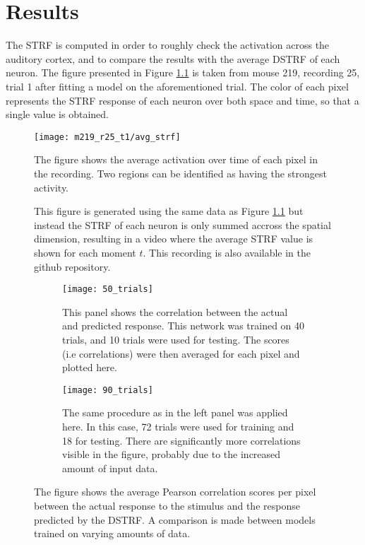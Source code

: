\chapter{Results}\label{results}

The STRF is computed in order to roughly check the activation across the auditory cortex, and to compare the results with the average DSTRF of each neuron. The figure presented in Figure \ref{fig:strf_m219_r25} is taken from mouse 219, recording 25, trial 1 after fitting a  model on the aforementioned trial. The color of each pixel represents the STRF response of each neuron over both space and time, so that a single value is obtained.

\begin{figure}[ht]
	\centering
	\texttt{[image: m219\_r25\_t1/avg\_strf]}
	\caption{The figure shows the average activation over time of each pixel in the recording. Two regions can be identified as having the strongest activity.}
	\label{fig:strf_m219_r25}
\end{figure}

\begin{figure}
\centering
{}
\caption{This figure is generated using the same data as Figure \ref{fig:strf_m219_r25} but instead the STRF of each neuron is only summed accross the spatial dimension, resulting in a video where the average STRF value is shown for each moment $t$. This recording is also available in the github repository.}
\end{figure}

\begin{figure}
	\begin{subfigure}{0.45\textwidth}
	\texttt{[image: 50\_trials]}
	\caption{This panel shows the correlation between the actual and predicted response. This network was trained on 40 trials, and 10 trials were used for testing. The scores (i.e correlations) were then averaged for each pixel and plotted here.}
	\end{subfigure}
	\hfill
	\begin{subfigure}{0.45\textwidth}
	\texttt{[image: 90\_trials]}
	\caption{The same procedure as in the left panel was applied here. In this case, 72 trials were used for training and 18 for testing. There are significantly more correlations visible in the figure, probably due to the increased amount of input data.}
\end{subfigure}
	\caption{The figure shows the average Pearson correlation scores per pixel between the actual response to the stimulus and the response predicted by the DSTRF. A comparison is made between models trained on varying amounts of data.}
	\label{fig:50trials}
\end{figure}


